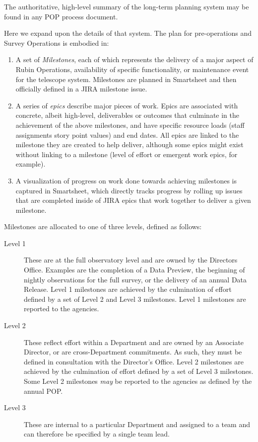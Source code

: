 The authoritative, high-level summary of the long-term planning system may be found in any POP process document.

Here we expand upon the details of that system.
The plan for pre-operations and Survey Operations is embodied in:

\begin{enumerate}
    \item
        A set of \emph{Milestones}, each of which represents the delivery of a major aspect of Rubin Operations, availability of specific functionality, or maintenance event for the telescope system. 
        Milestones are planned in Smartsheet and then officially defined in a \gls{JIRA} milestone issue.
    \item
        A series of \emph{epics} describe major pieces of work. 
        Epics are associated with concrete, albeit high-level, deliverables or outcomes that culminate in the achievement of the above milestones, and have specific resource loads (staff assignments story point values) and end dates. 
        All epics are linked to the milestone they are created to help deliver, although some epics might exist without linking to a milestone (level of effort or emergent work epics, for example).  
    \item
        A visualization of progress on work done towards achieving milestones is captured in Smartsheet, which directly tracks progress by rolling up issues that are completed inside of \gls{JIRA} epics that work together to deliver a given milestone.      
\end{enumerate}

Milestones are allocated to one of three levels, defined as follows:

\begin{description}
\item[Level 1]
These are at the full observatory level and are owned by the Directors Office. 
Examples are the completion of a Data Preview, the beginning of nightly observations for the full survey, or the delivery of an annual Data Release. 
Level 1 milestones are achieved by the culmination of effort defined by a set of Level 2 and Level 3 milestones. 
Level 1 milestones are reported to the agencies.
\item[Level 2]
These reflect effort within a Department and are owned by an Associate Director, or are cross-Department commitments. 
As such, they must be defined in consultation with the Director's Office.
Level 2 milestones are achieved by the culmination of effort defined by a set of Level 3 milestones.
Some Level 2 milestones {\it may} be reported to the agencies as defined by the annual POP. 
\item[Level 3]
These are internal to a particular Department and assigned to a team and can therefore be specified by a single team lead.
\end{description}

